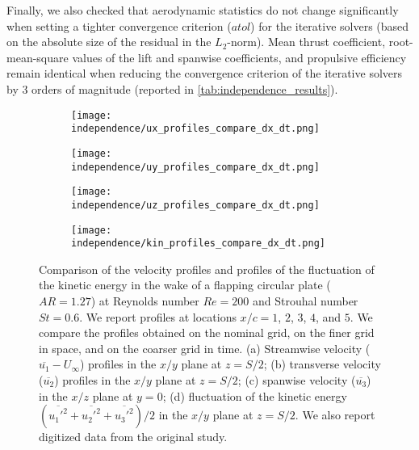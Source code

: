 Finally, we also checked that aerodynamic statistics do not change significantly when setting a tighter convergence criterion ($atol$) for the iterative solvers (based on the absolute size of the residual in the $L_2$-norm).
Mean thrust coefficient, root-mean-square values of the lift and spanwise coefficients, and propulsive efficiency remain identical when reducing the convergence criterion of the iterative solvers by 3 orders of magnitude (reported in \cref{tab:independence_results}).

\begin{figure}[!h]
  \centering
  \begin{subfigure}[c]{0.48\textwidth}
    \centering
    \texttt{[image: independence/ux\_profiles\_compare\_dx\_dt.png]}
    \caption{}
    \label{fig:independence_profiles:streamwise}
  \end{subfigure}
  \begin{subfigure}[c]{0.48\textwidth}
    \centering
    \texttt{[image: independence/uy\_profiles\_compare\_dx\_dt.png]}
    \caption{}
    \label{fig:independence_profiles:transverse}
  \end{subfigure}
  \begin{subfigure}[c]{0.48\textwidth}
    \centering
    \texttt{[image: independence/uz\_profiles\_compare\_dx\_dt.png]}
    \caption{}
    \label{fig:independence_profiles:spanwise}
  \end{subfigure}
  \begin{subfigure}[c]{0.48\textwidth}
    \centering
    \texttt{[image: independence/kin\_profiles\_compare\_dx\_dt.png]}
    \caption{}
    \label{fig:independence_profiles:kinetic}
  \end{subfigure}
  \caption{Comparison of the velocity profiles and profiles of the fluctuation of the kinetic energy in the wake of a flapping circular plate ($AR = 1.27$) at Reynolds number $Re = 200$ and Strouhal number $St = 0.6$. We report profiles at locations $x / c = 1$, $2$, $3$, $4$, and $5$. We compare the profiles obtained on the nominal grid, on the finer grid in space, and on the coarser grid in time. (a) Streamwise velocity ($\overline{u_1} - U_\infty$) profiles in the $x/y$ plane at $z = S / 2$; (b) transverse velocity ($\overline{u_2}$) profiles in the $x/y$ plane at $z = S / 2$; (c) spanwise velocity ($\overline{u_3}$) in the $x/z$ plane at $y = 0$; (d) fluctuation of the kinetic energy $( \overline{{u_1'}^2} + \overline{{u_2'}^2} + \overline{{u_3'}^2} ) / 2$ in the $x/y$ plane at $z = S / 2$. We also report digitized data from the original study.\supercite{li_dong_2016}}
  \label{fig:independence_profiles}
\end{figure}

